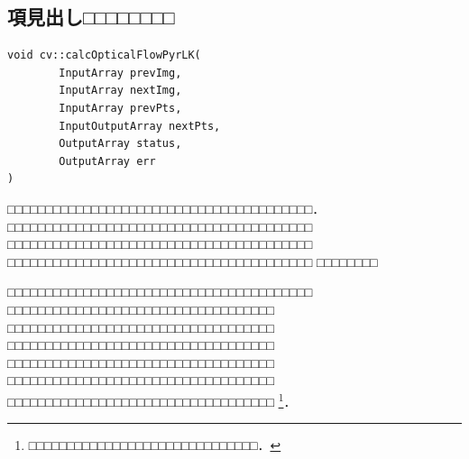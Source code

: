 \newpage


\subsection{項見出し□□□□□□□□}


\vspace{-6mm}
\begin{progbox}
\begin{verbatim}
void cv::calcOpticalFlowPyrLK( 
        InputArray prevImg, 
        InputArray nextImg,
        InputArray prevPts, 
        InputOutputArray nextPts,
        OutputArray status, 
        OutputArray err
)
\end{verbatim}
\end{progbox}


□□□□□□□□□□□□□□□□□□□□□□□□□□□□□□□□□□□□□□□□．
□□□□□□□□□□□□□□□□□□□□□□□□□□□□□□□□□□□□□□□□
□□□□□□□□□□□□□□□□□□□□□□□□□□□□□□□□□□□□□□□□
□□□□□□□□□□□□□□□□□□□□□□□□□□□□□□□□□□□□□□□□
□□□□□□□□
\vspace{0.5\Cvs}

□□□□□□□□□□□□□□□□□□□□□□□□□□□□□□□□□□□□□□□□
□□□□□□□□□□□□□□□□□□□□□□□□□□□□□□□□□□□
□□□□□□□□□□□□□□□□□□□□□□□□□□□□□□□□□□□
□□□□□□□□□□□□□□□□□□□□□□□□□□□□□□□□□□□
□□□□□□□□□□□□□□□□□□□□□□□□□□□□□□□□□□□
□□□□□□□□□□□□□□□□□□□□□□□□□□□□□□□□□□□
□□□□□□□□□□□□□□□□□□□□□□□□□□□□□□□□□□□
\footnote{□□□□□□□□□□□□□□□□□□□□□□□□□□□□□□．}．


\def\progtitle{sample-prog1(C++)\label{prog1}}
\begin{progboxt}

\end{progboxt}


\newpage

\shorikekka %

\vspace{-5mm}


